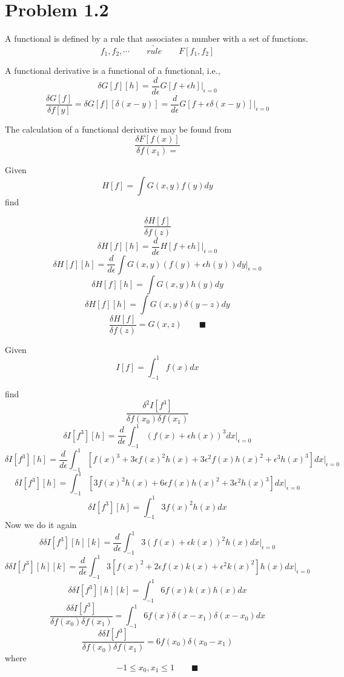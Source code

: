 \documentclass{amsart}
\begin{document}
\section*{Problem 1.2}

A functional is defined by a rule that associates a number with a set of functions.
\[f_1, f_2, \cdots\qquad\underrightarrow{rule}\qquad F[f_1, f_2] \]

A functional derivative is a functional of a functional, i.e.,
\[\delta G[f][h]=\frac{d}{d\epsilon}G[f+\epsilon h]\Big\vert_{\epsilon=0}\]
\[\frac{\delta G[f]}{\delta f[y]}=\delta G[f][\delta(x-y)]=\frac{d}{d\epsilon}G[f+\epsilon\delta(x-y)]\Big\vert_{\epsilon=0}\]

The calculation of a functional derivative may be found from
\[\frac{\delta F[f(x)]}{\delta f(x_1)=}
    \]
 
Given
\[H[f]=\int G(x,y)f(y)dy\]find

\[\frac{\delta H[f]}{\delta f(z)}\]
\[\delta H[f][h]=\frac{d}{d\epsilon}H[f+\epsilon h]\Big\vert_{\epsilon=0}\]
\[\delta H[f][h]=\frac{d}{d\epsilon}\int G(x,y)(f(y)+\epsilon h(y))dy\Big\vert_{\epsilon=0}\]
\[\delta H[f][h]=\int G(x,y)h(y)dy\]
\[\delta H[f][h]=\int G(x,y)\delta(y-z)dy\]
\[\frac{\delta H[f]}{\delta f(z)}=G(x,z) \qquad \blacksquare\]

Given
\[I[f]=\int_{-1}^{1} f(x)dx\]

find
\[\frac{\delta^2 I[f^3]}{\delta f(x_0)\delta f(x_1)}\]
\[\delta I[f^3][h]=\frac{d}{d\epsilon}\int_{-1}^{1} (f(x)+\epsilon h(x))^3 dx\Big\vert_{\epsilon=0}\]
\[\delta I[f^3][h]=\frac{d}{d\epsilon}\int_{-1}^{1} [f(x)^3+3\epsilon f(x)^2 h(x)+3\epsilon^2 f(x)h(x)^2+\epsilon^3 h(x)^3] dx\Big\vert_{\epsilon=0}\]
\[\delta I[f^3][h]=\int_{-1}^{1} [3f(x)^2 h(x)+6\epsilon f(x)h(x)^2+3\epsilon^2 h(x)^3] dx\Big\vert_{\epsilon=0}\]
\[\delta I[f^3][h]=\int_{-1}^{1} 3f(x)^2 h(x) dx\]
Now we do it again
\[\delta \delta I[f^3][h][k]=\frac{d}{d\epsilon}\int_{-1}^{1} 3(f(x)+\epsilon k(x))^2 h(x) dx\Big\vert_{\epsilon=0}\]
\[\delta \delta I[f^3][h][k]=\frac{d}{d\epsilon}\int_{-1}^{1} 3[f(x)^2+2\epsilon f(x)k(x)+\epsilon^2 k(x)^2] h(x) dx\Big\vert_{\epsilon=0}\]
\[\delta \delta I[f^3][h][k]=\int_{-1}^{1} 6f(x)k(x)h(x) dx\]
\[\frac{\delta \delta I[f^3]}{\delta f(x_0)\delta f(x_1)}=\int_{-1}^{1} 6f(x)\delta(x-x_1)\delta(x-x_0) dx\]
\[\frac{\delta \delta I[f^3]}{\delta f(x_0)\delta f(x_1)}=6f(x_0)\delta(x_0-x_1)\] where \[-1\leq x_0, x_1\leq 1 \qquad \blacksquare\]
\end{document}
